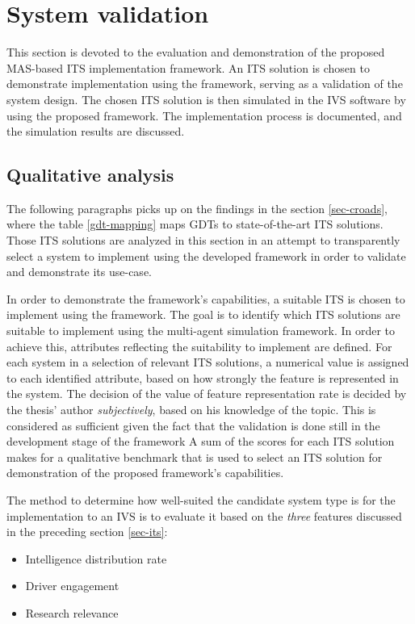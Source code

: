 \documentclass[0main.tex]{subfiles}
\begin{document}
\section{System validation} \label{sec-validation}

This section is devoted to the evaluation and demonstration of the proposed MAS-based ITS
implementation framework. An ITS solution is chosen to demonstrate implementation using 
the framework, serving as a validation of the system design. The chosen ITS solution is then simulated
in the IVS software by using the proposed framework. The implementation process is documented, 
and the simulation results are discussed.

\subsection{Qualitative analysis}

The following paragraphs picks up on the findings in the section \ref{sec-croads}, where the
table \ref{gdt-mapping} maps GDTs to state-of-the-art ITS solutions. Those
ITS solutions are analyzed in this section in an attempt to transparently select a 
system to implement using the developed framework in order to validate and demonstrate its
use-case. 

In order to demonstrate the framework's capabilities, a suitable ITS is chosen to implement
using the framework.  The goal is to identify which ITS solutions are suitable to implement
using the multi-agent simulation framework. In order to achieve this, attributes reflecting
the suitability to implement are defined. For each system in a selection of relevant ITS
solutions, a numerical value is assigned to each identified attribute, based on how strongly
the feature is represented in the system. The decision of the value of feature representation
rate is decided by the thesis' author \emph{subjectively}, based on his knowledge of the topic. This
is considered as sufficient given the fact that the validation is done still in the development
stage of the framework A sum of the scores for each ITS solution makes for a qualitative
benchmark that is used to select an ITS solution for demonstration of the proposed framework's
capabilities.

The method to determine how well-suited the candidate system type is for the implementation to
an IVS is to evaluate it based on the \emph{three} features discussed in the preceding
section \ref{sec-its}: 

\begin{itemize}
    \item Intelligence distribution rate
    \item Driver engagement
    \item Research relevance
\end{itemize}
\end{document}
